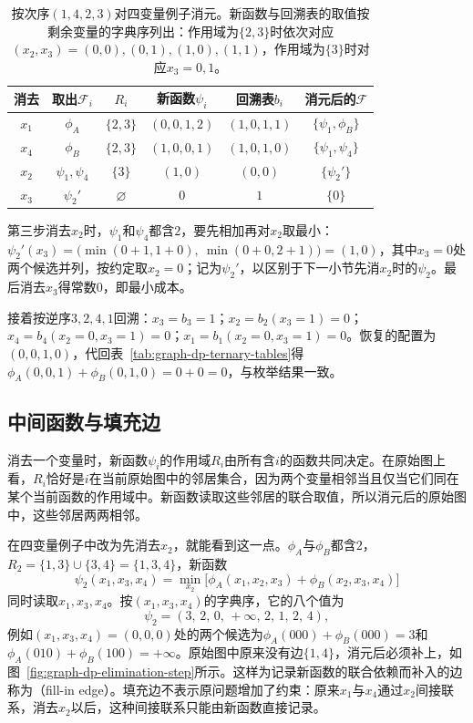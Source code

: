 \begin{table}[!htb]
  \centering
  \caption{按次序$(1,4,2,3)$对四变量例子消元。新函数与回溯表的取值按剩余变量的字典序列出：作用域为$\{2,3\}$时依次对应$(x_2,x_3)=(0,0),(0,1),(1,0),(1,1)$，作用域为$\{3\}$时对应$x_3=0,1$。}
  \label{tab:graph-dp-elimination-trace}
  \small
  \begin{tabular}{@{}cccccc@{}}
    \toprule
    消去 & 取出$\mathcal F_i$ & $R_i$ & 新函数$\psi_i$ & 回溯表$b_i$ & 消元后的$\mathcal F$\\
    \midrule
    $x_1$ & $\phi_A$ & $\{2,3\}$ & $(0,0,1,2)$ & $(1,0,1,1)$ & $\{\psi_1,\phi_B\}$\\
    $x_4$ & $\phi_B$ & $\{2,3\}$ & $(1,0,0,1)$ & $(1,0,1,0)$ & $\{\psi_1,\psi_4\}$\\
    $x_2$ & $\psi_1,\psi_4$ & $\{3\}$ & $(1,0)$ & $(0,0)$ & $\{\psi_2'\}$\\
    $x_3$ & $\psi_2'$ & $\varnothing$ & $0$ & $1$ & $\{0\}$\\
    \bottomrule
  \end{tabular}
\end{table}

第三步消去$x_2$时，$\psi_1$和$\psi_4$都含$2$，要先相加再对$x_2$取最小：$\psi_2'(x_3)=\bigl(\min(0+1,1+0),\ \min(0+0,2+1)\bigr)=(1,0)$，其中$x_3=0$处两个候选并列，按约定取$x_2=0$；记为$\psi_2'$，以区别于下一小节先消$x_2$时的$\psi_2$。最后消去$x_3$得常数$0$，即最小成本。

接着按逆序$3,2,4,1$回溯：$x_3=b_3=1$；$x_2=b_2(x_3{=}1)=0$；$x_4=b_4(x_2{=}0,x_3{=}1)=0$；$x_1=b_1(x_2{=}0,x_3{=}1)=0$。恢复的配置为$(0,0,1,0)$，代回表~\ref{tab:graph-dp-ternary-tables}得$\phi_A(0,0,1)+\phi_B(0,1,0)=0+0=0$，与枚举结果一致。

\subsection{中间函数与填充边}
\label{sec:graph-dp-fill-in}

消去一个变量时，新函数$\psi_i$的作用域$R_i$由所有含$i$的函数共同决定。在原始图上看，$R_i$恰好是$i$在当前原始图中的邻居集合，因为两个变量相邻当且仅当它们同在某个当前函数的作用域中。新函数读取这些邻居的联合取值，所以消元后的原始图中，这些邻居两两相邻。

在四变量例子中改为先消去$x_2$，就能看到这一点。$\phi_A$与$\phi_B$都含$2$，$R_2=\{1,3\}\cup\{3,4\}=\{1,3,4\}$，新函数
\[
\psi_2(x_1,x_3,x_4)=\min_{x_2}\bigl[\phi_A(x_1,x_2,x_3)+\phi_B(x_2,x_3,x_4)\bigr]
\]
同时读取$x_1,x_3,x_4$。按$(x_1,x_3,x_4)$的字典序，它的八个值为
\[
\psi_2=(3,\,2,\,0,\,+\infty,\,2,\,1,\,2,\,4),
\]
例如$(x_1,x_3,x_4)=(0,0,0)$处的两个候选为$\phi_A(000)+\phi_B(000)=3$和$\phi_A(010)+\phi_B(100)=+\infty$。原始图中原来没有边$\{1,4\}$，消元后必须补上，如图~\ref{fig:graph-dp-elimination-step}所示。这样为记录新函数的联合依赖而补入的边称为（fill-in edge）。填充边不表示原问题增加了约束：原来$x_1$与$x_4$通过$x_2$间接联系，消去$x_2$以后，这种间接联系只能由新函数直接记录。

